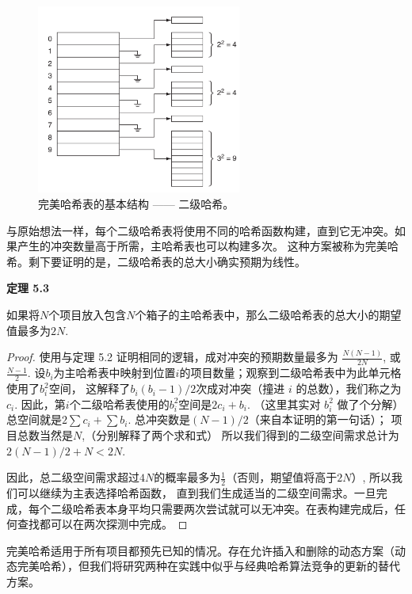 \documentclass[a4paper]{ctexart}
\theoremstyle{definition}
\theoremstyle{definition}
\begin{document}
\begin{figure}
  \centering
  \includegraphics[width=0.6\textwidth]{images/perfect_hash.png}
  \caption{完美哈希表的基本结构 —— 二级哈希。}
  \label{fig:perfect_hash}
\end{figure}

与原始想法一样，每个二级哈希表将使用不同的哈希函数构建，直到它无冲突。如果产生的冲突数量高于所需，主哈希表也可以构建多次。
这种方案被称为完美哈希。剩下要证明的是，二级哈希表的总大小确实预期为线性。

\textbf{定理 5.3}

如果将\( N \)个项目放入包含\( N \)个箱子的主哈希表中，那么二级哈希表的总大小的期望值最多为\( 2N \).

\begin{proof}
使用与定理 5.2 证明相同的逻辑，成对冲突的预期数量最多为 \( \frac{N(N-1)}{2N} \), 或\( \frac{N-1}{2} \). 
设\( b_i \)为主哈希表中映射到位置\( i \)的项目数量；观察到二级哈希表中为此单元格使用了\( b_i^2 \)空间，
这解释了\( b_i(b_i-1)/2 \)次成对冲突（撞进 $i$ 的总数），我们称之为\( c_i \). 因此，第\( i \)个二级哈希表使用的\( b_i^2 \)空间是\( 2c_i + b_i \). 
（这里其实对 $b_i^2$ 做了个分解）总空间就是\( 2\sum c_i + \sum b_i \). 总冲突数是\( (N-1)/2 \)（来自本证明的第一句话）；
项目总数当然是\( N \),（分别解释了两个求和式） 所以我们得到的二级空间需求总计为\( 2(N-1)/2 + N < 2N \).

因此，总二级空间需求超过\( 4N \)的概率最多为\( \frac{1}{2} \)（否则，期望值将高于\( 2N \)）, 所以我们可以继续为主表选择哈希函数，
直到我们生成适当的二级空间需求。一旦完成，每个二级哈希表本身平均只需要两次尝试就可以无冲突。在表构建完成后，任何查找都可以在两次探测中完成。
\end{proof}
  
完美哈希适用于所有项目都预先已知的情况。存在允许插入和删除的动态方案（动态完美哈希），但我们将研究两种在实践中似乎与经典哈希算法竞争的更新的替代方案。
    
\end{document}
